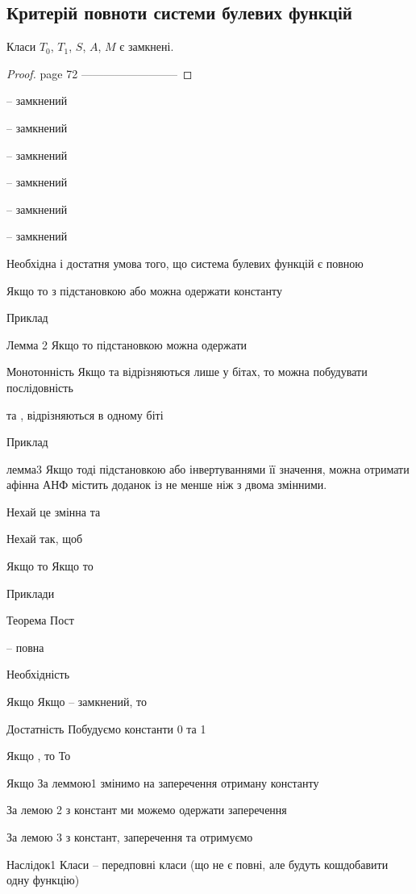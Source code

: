\subsection{Критерій повноти системи булевих функцій}

\begin{claim}
    Класи $T_0$, $T_1$, $S$, $A$, $M$ є замкнені.
\end{claim}
\begin{proof}
    page 72 --------------------------
\end{proof}

-- замкнений

-- замкнений

-- замкнений

-- замкнений

-- замкнений


-- замкнений


Необхідна і достатня умова того, що система булевих функцій є повною

Якщо  то з  підстановкою  або  можна одержати константу

Приклад

Лемма 2 
Якщо  то  підстановкою  можна одержати 

Монотонність
Якщо  та  відрізняються лише у  бітах, то можна побудувати послідовність

та  , відрізняються в одному біті

Приклад

лемма3 
Якщо  тоді  підстановкою  або інвертуваннями її значення, можна отримати 
афінна  АНФ містить доданок із не менше ніж з двома змінними.

Нехай це змінна  та 

Нехай так, щоб

Якщо  то
Якщо  то

Приклади

Теорема Пост

-- повна

Необхідність

Якщо 
Якщо -- замкнений, то

Достатність
Побудуємо константи 0 та 1

Якщо  , то 
То

Якщо 
За леммою1 
змінимо на заперечення отриману константу

За лемою 2 з констант ми можемо одержати заперечення

За лемою 3 з констант, заперечення та  отримуємо 

Наслідок1 Класи  -- передповні класи
(що не є повні, але будуть кошдобавити одну функцію)

